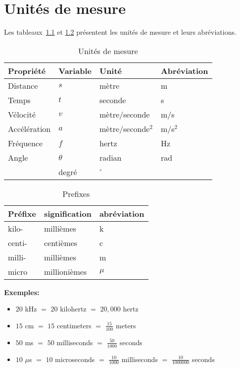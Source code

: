 
\chapter{Unités de mesure}\label{ch.units}

Les tableaux~\ref{tab.units} et \ref{tab.prefixes} présentent les unités de mesure et leurs abréviations.

\begin{table}
\caption{Unités de mesure}
\label{tab.units}
\begin{tabular}{p{2cm}p{1.5cm}p{2.5cm}p{2cm}}
\hline
Propriété & Variable & Unité & Abréviation \\
\hline
Distance & $s$ & mètre & m\\
Temps & $t$ & seconde & s\\
Vélocité & $v$ & mètre/seconde & m/s\\
Accélération & $a$ & mètre/seconde$^2$ & m/s$^2$\\
Fréquence & $f$ & hertz& Hz\\
Angle & $\theta$ & radian & rad\\
& degré & $^\circ$\\
\hline
\end{tabular}
\end{table}

\begin{table}
\caption{Prefixes}
\label{tab.prefixes}
\begin{tabular}{p{1.5cm}p{2.2cm}p{1.7cm}}
\hline
Préfixe & signification & abréviation \\
\hline
kilo- & millièmes & k\\
centi- & centièmes & c\\
milli- & millièmes & m\\
micro & millionièmes & $\mu$\\
\hline
\end{tabular}
\end{table}

\noindent\textbf{Exemples:}

\begin{itemize}\setlength{\itemsep}{6pt}
\item $20$ kHz $=$ $20$ kilohertz $=$ $20,000$ hertz
\item $15$ cm $=$ $15$ centimeters $=$ $\frac{15}{100}$ meters
\item $50$ ms $=$ $50$ milliseconds $=$ $\frac{50}{1000}$ seconds
\item $10$ $\mu$s $=$ $10$ microseconds $=$ $\frac{10}{1000}$ milliseconds $=$ $\frac{10}{1000000}$ seconds
\end{itemize}

